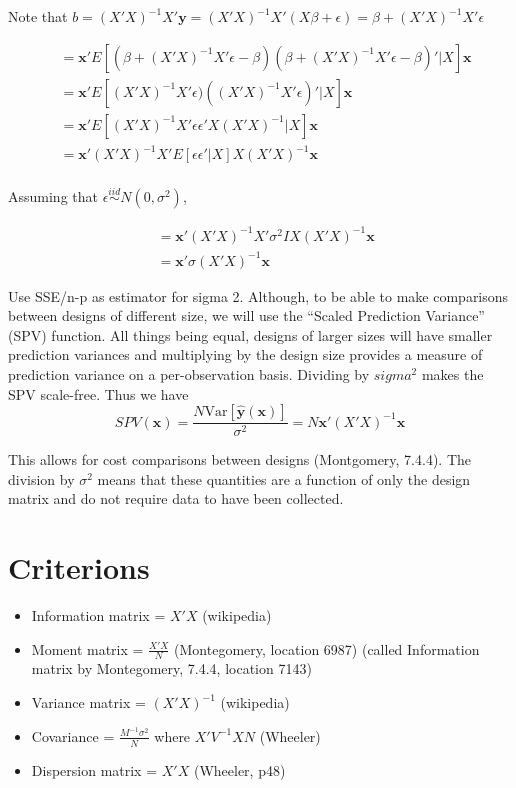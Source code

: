 \documentclass{article}\usepackage[]{graphicx}\usepackage[]{color}
\newcommand{\Var}{\mathrm{Var}}
\begin{document}
Note that $b=(X'X)^{-1} X'\textbf{y} = (X'X)^{-1}X'(X\beta+\epsilon) = \beta + (X'X)^{-1} X'\epsilon$

\begin{align*}
  &= \textbf{x}' E[(\beta + (X'X)^{-1}X'\epsilon - \beta)(\beta + (X'X)^{-1}X'\epsilon - \beta)' | X] \textbf{x} \\
  &= \textbf{x}' E[(X'X)^{-1}X'\epsilon)((X'X)^{-1}X'\epsilon)' | X] \textbf{x} \\
  &= \textbf{x}' E[(X'X)^{-1}X'\epsilon \epsilon' X (X'X)^{-1} | X] \textbf{x} \\
  &= \textbf{x}' (X'X)^{-1} X' E[\epsilon \epsilon' | X] X(X'X)^{-1} \textbf{x} \\
\end{align*}

Assuming that $\epsilon \stackrel{iid}{\sim} N(0,\sigma^2) $,

\begin{align*}
  &= \textbf{x}' (X'X)^{-1} X' \sigma^2 I X(X'X)^{-1} \textbf{x} \\
  &= \textbf{x}' \sigma (X' X)^{-1} \textbf{x}
\end{align*}

Use SSE/n-p as estimator for sigma 2. Although, to be able to make comparisons between designs of different size, we will use the ``Scaled Prediction Variance'' (SPV) function. All things being equal, designs of larger sizes will have smaller prediction variances and multiplying by the design size provides a measure of prediction variance on a per-observation basis. Dividing by $sigma^2$ makes the SPV scale-free. Thus we have
$$ SPV(\textbf{x}) = \frac{N \Var[\hat{\textbf{y}}(\textbf{x})]}{\sigma^2} = N \textbf{x}' (X' X)^{-1} \textbf{x} $$

This allows for cost comparisons between designs (Montgomery, 7.4.4). The division by $\sigma^2$ means that these quantities are a function of only the design matrix and do not require data to have been collected.

\section{Criterions}
\begin{itemize}
\item Information matrix = $X'X$ (wikipedia)
\item Moment matrix = $\frac{X'X}{N}$ (Montegomery, location 6987) (called Information matrix by Montegomery, 7.4.4, location 7143)
\item Variance matrix = $(X'X)^{-1}$ (wikipedia)
\item Covariance = $\frac{M^{-1}\sigma^2}{N}$ where ${X'V^{-1}X}{N}$ (Wheeler)
\item Dispersion matrix = $X'X$ (Wheeler, p48)
\end{itemize}
\end{document}
